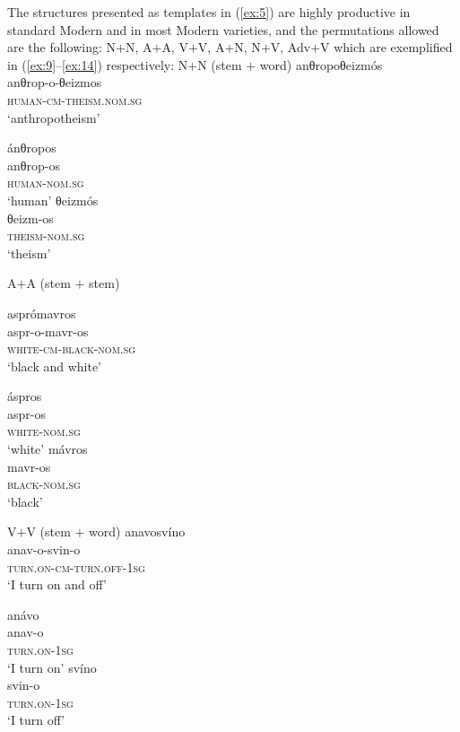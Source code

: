 \documentclass[output=paper]{LSP/langsci}
\begin{document}
The structures presented as templates in (\ref{ex:5}) are highly productive in standard Modern  and in most Modern  varieties, and the permutations allowed are the following: N$+$N, A$+$A, V$+$V, A$+$N, N$+$V, Adv$+$V which are exemplified in (\ref{ex:9}--\ref{ex:14}) respectively:
\ea\label{ex:9} N$+$N (stem $+$ word)
	\ea\label{ex:9a}
		\glll	anθropoθeizmós\\
				anθrop-o-θeizmos\\
				\textsc{human}-\textsc{cm}-\textsc{theism}.\textsc{nom.sg}\\
		\glt	`anthropotheism'
\begin{multicols}{2}
	\ex\label{ex:9b}
		\glll ánθropos\\
				anθrop-os\\
				\textsc{human}-\textsc{nom.sg}\\
		\glt `human'
	\ex\label{ex:9c}
		\glll	θeizmós\\
				θeizm-os\\
				\textsc{theism}-\textsc{nom.sg}\\
		\glt `theism'
\end{multicols}
	\z
\z
\ea\label{ex:10} A$+$A (stem $+$ stem)\begin{multicols}{2}
	\ea\label{ex:10a}
		\glll 	asprómavros\\
				aspr-o-mavr-os\\
				\textsc{white-cm-black-nom.sg}\\
		\glt	`black and white'

	\ex\label{ex:10b}
			\glll	áspros\\
					aspr-os\\
					\textsc{white-nom.sg}\\
			\glt	`white'
	\ex\label{ex:10c}
			\glll mávros\\
					mavr-os\\
					\textsc{black-nom.sg}\\
			\glt	`black'

	\z\end{multicols}
\z
\ea\label{ex:11} V$+$V (stem $+$ word)
	\ea\label{ex:11a}
		\glll	anavosvíno\\
				anav-o-svin-o\\
				\textsc{turn.on-cm-turn.off-1sg}\\
		\glt	`I turn on and off'
\begin{multicols}{2}
	\ex\label{ex:11b}
		\glll	anávo\\
				anav-o\\
				\textsc{turn.on-1sg}\\
		\glt	`I turn on'
	\ex\label{ex:11c}
		\glll svíno\\
				svin-o\\
				\textsc{turn.on-1sg}\\
		\glt	`I turn off'
\end{multicols}
\end{document}
